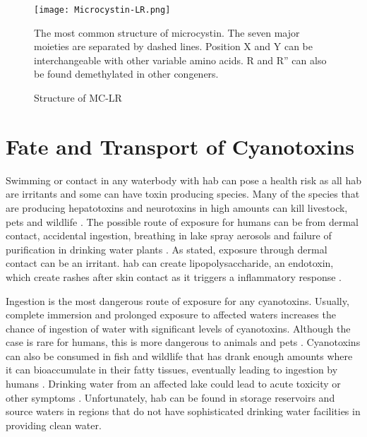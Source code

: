 \begin{figure}[!h]
   \texttt{[image: Microcystin-LR.png]}
   \caption{Structure of MC-LR}
   \label{fig:structure1}
   \begin{flushleft}
   The most common structure of microcystin. The seven major moieties are separated by dashed lines. Position X and Y can be interchangeable with other variable amino acids. R and R'' can also be found demethylated in other congeners. 
     \end{flushleft}
 \end{figure}

 \clearpage

\section{Fate and Transport of Cyanotoxins}
Swimming or contact in any waterbody with \gls{hab} can pose a health risk as all \gls{hab} are irritants and some can have toxin producing species. Many of the species that are producing hepatotoxins and neurotoxins in high amounts can kill livestock, pets and wildlife \cite{anderson_harmful_2002}. The possible route of exposure  for humans can be from dermal contact, accidental ingestion, breathing in lake spray aerosols and failure of purification in drinking water plants \cite{may_aerosol_2018,codd_cyanobacterial_1999}. As stated, exposure through dermal contact can be an irritant. \gls{hab} can create lipopolysaccharide, an endotoxin, which create rashes after skin contact as it triggers a inflammatory response \cite{ moore_richard_cyanobacterial_1993}.

Ingestion is the most dangerous route of exposure for any cyanotoxins. Usually, complete immersion and prolonged exposure to affected waters increases the chance of ingestion of water with significant levels of cyanotoxins. Although the case is rare for humans, this is more dangerous to animals and pets \cite{koreiviene_cyanotoxin_2014}. Cyanotoxins can also be consumed in fish and wildlife that has drank enough amounts where it can bioaccumulate in their fatty tissues, eventually leading to ingestion by humans \cite{saoudi_management_2017}. Drinking water from an affected lake could  lead to acute toxicity or other symptoms \cite{monks_potent_2007}. Unfortunately, \gls{hab} can be found in storage reservoirs and source waters in regions that do not have sophisticated drinking water facilities in providing clean water. 

